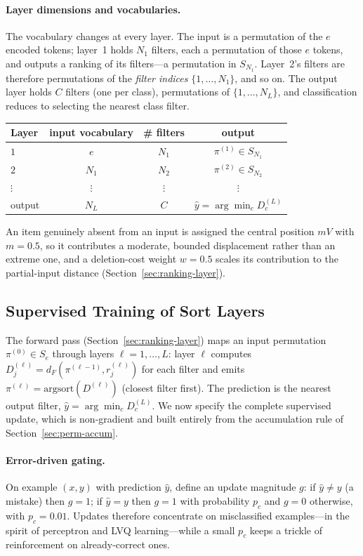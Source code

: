 \documentclass[12pt]{article}
\newcommand{\argsort}{\mathrm{argsort}}
\begin{document}
\paragraph{Layer dimensions and vocabularies.}
The vocabulary changes at every layer. The input is a permutation of the $e$ encoded tokens; layer~1 holds $N_1$ filters, each a permutation of those $e$ tokens, and outputs a ranking of its filters---a permutation in $S_{N_1}$. Layer~2's filters are therefore permutations of the \emph{filter indices} $\{1,\dots,N_1\}$, and so on. The output layer holds $C$ filters (one per class), permutations of $\{1,\dots,N_L\}$, and classification reduces to selecting the nearest class filter.
\begin{center}
\begin{tabular}{lccc}
\toprule
Layer & input vocabulary & \# filters & output \\
\midrule
$1$ & $e$ & $N_1$ & $\pi^{(1)}\in S_{N_1}$ \\
$2$ & $N_1$ & $N_2$ & $\pi^{(2)}\in S_{N_2}$ \\
$\vdots$ & $\vdots$ & $\vdots$ & $\vdots$ \\
output & $N_L$ & $C$ & $\hat{y}=\arg\min_c D^{(L)}_c$ \\
\bottomrule
\end{tabular}
\end{center}
An item genuinely absent from an input is assigned the central position $mV$ with $m=0.5$, so it contributes a moderate, bounded displacement rather than an extreme one, and a deletion-cost weight $w=0.5$ scales its contribution to the partial-input distance (Section~\ref{sec:ranking-layer}).

\subsection{Supervised Training of Sort Layers}
\label{sec:supervised-training}

The forward pass (Section~\ref{sec:ranking-layer}) maps an input permutation $\pi^{(0)} \in S_e$ through layers $\ell = 1, \dots, L$: layer $\ell$ computes $D^{(\ell)}_j = d_F(\pi^{(\ell-1)}, r^{(\ell)}_j)$ for each filter and emits $\pi^{(\ell)} = \argsort(D^{(\ell)})$ (closest filter first). The prediction is the nearest output filter, $\hat{y} = \arg\min_c D^{(L)}_c$. We now specify the complete supervised update, which is non-gradient and built entirely from the accumulation rule of Section~\ref{sec:perm-accum}.

\paragraph{Error-driven gating.}
On example $(x, y)$ with prediction $\hat{y}$, define an update magnitude $g$: if $\hat{y} \neq y$ (a mistake) then $g = 1$; if $\hat{y} = y$ then $g = 1$ with probability $p_c$ and $g = 0$ otherwise, with $p_c = 0.01$. Updates therefore concentrate on misclassified examples---in the spirit of perceptron and LVQ learning---while a small $p_c$ keeps a trickle of reinforcement on already-correct ones.
\end{document}
